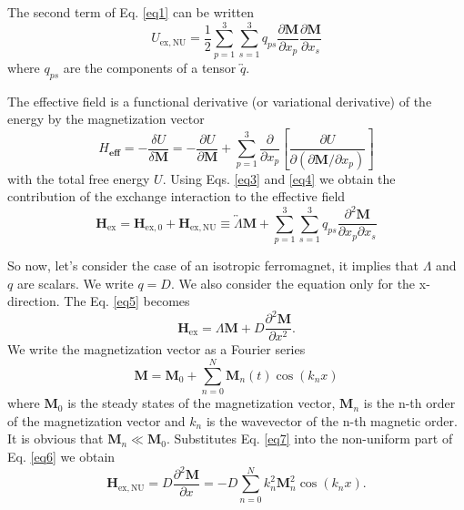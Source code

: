 \documentclass[12pt,a4paper]{article}
\begin{document}
The second term of Eq. \eqref{eq1} can be written
\begin{equation}
    U_{\mathrm{ex,NU}} = \frac{1}{2} \sum_{p=1}^3 \sum_{s=1}^3 q_{ps} \frac{\partial \mathbf{M}}{\partial x_p} \frac{\partial \mathbf{M}}{\partial x_s}
    \label{eq3}
\end{equation}
where $q_{ps}$ are the components of a tensor $\overleftrightarrow{q}$.

The effective field is a functional derivative (or variational derivative) of the energy by the magnetization vector
\begin{equation}
    H_{\mathbf{eff}} = - \frac{\delta U}{\delta \mathbf{M}} = - \frac{\partial U}{\partial \mathbf{M}} + \sum_{p=1}^3 \frac{\partial}{\partial x_p} \left[ \frac{\partial U}{\partial \left(\partial \mathbf{M} / \partial x_{p} \right)} \right]
    \label{eq4}
\end{equation}
with the total free energy $U$.
Using Eqs. \eqref{eq3} and \eqref{eq4} we obtain the contribution of the exchange interaction to the effective field
\begin{equation}
    \mathbf{H}_{\mathrm{ex}} = \mathbf{H}_{\mathrm{ex,0}} + \mathbf{H}_{\mathrm{ex,NU}} \equiv \overleftrightarrow{\Lambda} \mathbf{M} + \sum_{p=1}^3 \sum_{s=1}^3 q_{ps} \frac{\partial^2 \mathbf{M}}{\partial x_p \partial x_s}
    \label{eq5}
\end{equation}

So now, let's consider the case of an isotropic ferromagnet, it implies that $\Lambda$ and $q$ are scalars.
We write $q = D$.
We also consider the equation only for the x-direction.
The Eq. \eqref{eq5} becomes
\begin{equation}
    \mathbf{H}_{\mathrm{ex}} = \Lambda \mathbf{M} + D \frac{\partial^2 \mathbf{M}}{\partial x^2}.
    \label{eq6}
\end{equation}
We write the magnetization vector as a Fourier series
\begin{equation}
    \mathbf{M} = \mathbf{M}_0 + \sum_{n=0}^N \mathbf{M}_n \left( t \right) \cos \left( k_n x\right)
    \label{eq7}
\end{equation}
where $\mathbf{M}_0$ is the steady states of the magnetization vector, $\mathbf{M}_n$ is the n-th order of the magnetization vector and $k_n$ is the wavevector of the n-th magnetic order.
It is obvious that $\mathbf{M}_n \ll \mathbf{M}_0$.
Substitutes Eq. \eqref{eq7} into the non-uniform part of Eq. \eqref{eq6} we obtain 
\begin{equation}
    \mathbf{H}_{\mathrm{ex,NU}} =  D \frac{\partial^2 \mathbf{M}}{\partial x} = - D \sum_{n=0}^N k^2_n \mathbf{M}_n^2 \cos \left( k_n x\right).
    \label{eq8}
\end{equation}
\end{document}

